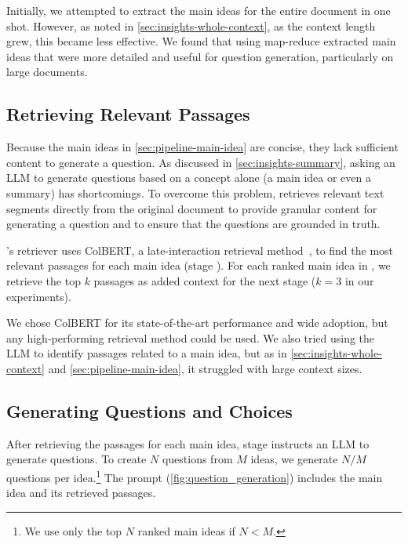 Initially, we attempted to extract the main ideas for the entire document in one shot. However, as noted in \autoref{sec:insights-whole-context}, as the context length grew, this became less effective. We found that using map-reduce extracted main ideas that were more detailed and useful for question generation, particularly on large documents.



\subsection{Retrieving Relevant Passages}
\label{sec:pipeline-retrieval}

Because the main ideas in \autoref{sec:pipeline-main-idea} are concise, they lack sufficient content to generate a question. As discussed in \autoref{sec:insights-summary}, asking an LLM to generate questions based on a concept alone (a main idea or even a summary) has shortcomings. To overcome this problem, \name retrieves relevant text segments directly from the original document to provide granular content for generating a question and to ensure that the questions are grounded in truth.


\name's retriever uses ColBERT, a late-interaction retrieval method~\citep{colbert, colbertv2}, to find the most relevant passages for each main idea (stage ).
For each ranked main idea in , we retrieve the top $k$ passages as added context for the next stage ($k=3$ in our experiments).

We chose ColBERT for its state-of-the-art performance and wide adoption, but any high-performing retrieval method could be used. We also tried using the LLM to identify passages related to a main idea, but as in \autoref{sec:insights-whole-context} and \autoref{sec:pipeline-main-idea}, it struggled with large context sizes.


\subsection{Generating Questions and Choices}
\label{sec:pipeline-QG}


After retrieving the passages for each main idea, stage  instructs an LLM to generate questions. To create $N$ questions from $M$ ideas, we generate $N/M$ questions per idea.\footnote{We use only the top $N$ ranked main ideas if $N < M$.}  The prompt (\autoref{fig:question_generation}) includes the main idea and its retrieved passages.


